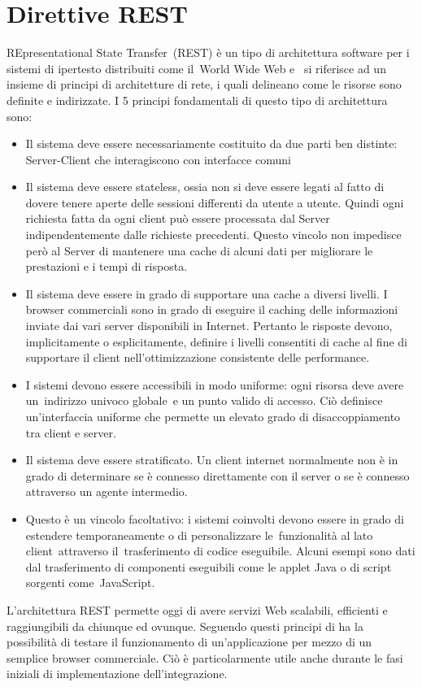 \section{Direttive REST} %
\label{sec:direttive_rest}

REpresentational State Transfer (REST) è un tipo di architettura software per i sistemi di ipertesto distribuiti come il World Wide Web e  si riferisce ad un insieme di principi di architetture di rete, i quali delineano come le risorse sono definite e indirizzate. I 5 principi fondamentali di questo tipo di architettura sono:
\begin{itemize}
    \item Il sistema deve essere necessariamente costituito da due parti ben distinte: Server-Client che interagiscono con interfacce comuni
    \item Il sistema deve essere stateless, ossia non si deve essere legati al fatto di dovere tenere aperte delle sessioni differenti da utente a utente. Quindi ogni richiesta fatta da ogni client può essere processata dal Server indipendentemente dalle richieste precedenti. Questo vincolo non impedisce però al Server di mantenere una cache di alcuni dati per migliorare le prestazioni e i tempi di risposta.
    \item Il sistema deve essere in grado di supportare una cache a diversi livelli. I browser commerciali sono in grado di eseguire il caching delle informazioni inviate dai vari server disponibili in Internet. Pertanto le risposte devono, implicitamente o esplicitamente, definire i livelli consentiti di cache al fine di supportare il client nell’ottimizzazione consistente delle performance.
    \item I sistemi devono essere accessibili in modo uniforme: ogni risorsa deve avere un indirizzo univoco globale e un punto valido di accesso. Ciò definisce un’interfaccia uniforme che permette un elevato grado di disaccoppiamento tra client e server.
    \item Il sistema deve essere stratificato. Un client internet normalmente non è in grado di determinare se è connesso direttamente con il server o se è connesso attraverso un agente intermedio.
    \item Questo è un vincolo facoltativo: i sistemi coinvolti devono essere in grado di estendere temporaneamente o di personalizzare le funzionalità al lato client attraverso il trasferimento di codice eseguibile. Alcuni esempi sono dati dal trasferimento di componenti eseguibili come le applet Java o di script sorgenti come JavaScript.
\end{itemize}

L’architettura REST permette oggi di avere servizi Web scalabili, efficienti e raggiungibili da chiunque ed ovunque. Seguendo questi principi di ha la possibilità di testare il funzionamento di un’applicazione per mezzo di un semplice browser commerciale. Ciò è particolarmente utile anche durante le fasi iniziali di implementazione dell’integrazione.

\newpage
